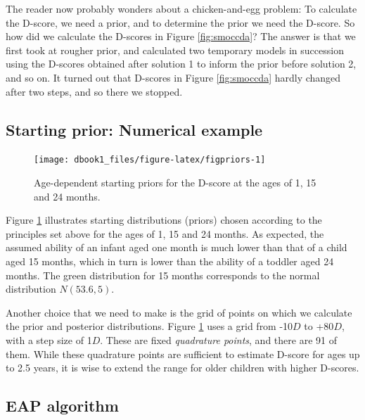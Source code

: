 \documentclass[
]{book}
\begin{document}
The reader now probably wonders about a chicken-and-egg problem: To calculate the D-score, we need a prior, and to determine the prior we need the D-score. So how did we calculate the D-scores in Figure \ref{fig:smoccda}? The answer is that we first took at rougher prior, and calculated two temporary models in succession using the D-scores obtained after solution 1 to inform the prior before solution 2, and so on. It turned out that D-scores in Figure \ref{fig:smoccda} hardly changed after two steps, and so there we stopped.

\hypertarget{sec:adp}{%
\subsection{Starting prior: Numerical example}\label{sec:adp}}

\begin{figure}

{\centering \texttt{[image: dbook1\_files/figure-latex/figpriors-1]} 

}

\caption{Age-dependent starting priors for the D-score at the ages of 1, 15 and 24 months.}\label{fig:figpriors}
\end{figure}



Figure \ref{fig:figpriors} illustrates starting distributions (priors) chosen according to the principles set above for the ages of 1, 15 and 24 months. As expected, the assumed ability of an infant aged one month is much lower than that of a child aged 15 months, which in turn is lower than the ability of a toddler aged 24 months. The green distribution for 15 months corresponds to the normal distribution \(N(53.6, 5)\).

Another choice that we need to make is the grid of points on which we calculate the prior and posterior distributions. Figure \ref{fig:figpriors} uses a grid from -10\(D\) to +80\(D\), with a step size of 1\(D\). These are fixed \emph{quadrature points}, and there are 91 of them. While these quadrature points are sufficient to estimate D-score for ages up to 2.5 years, it is wise to extend the range for older children with higher D-scores.

\hypertarget{sec:EAP}{%
\subsection{EAP algorithm}\label{sec:EAP}}
\end{document}
